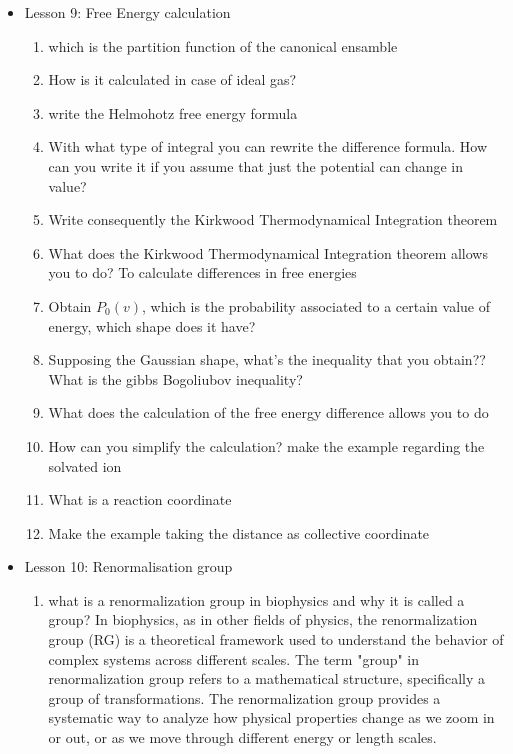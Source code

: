 {\begin{itemize}
\begin{enumerate}
    \end{enumerate}
    \item Lesson 9: Free Energy calculation
    \begin{enumerate}
        \item which is the partition function of the canonical ensamble
        \item How is it calculated in case of ideal gas?
        \item write the Helmohotz free energy formula
        \item With what type of integral you can rewrite the difference formula. How can you write it if you assume that just the potential can change in value?
        \item Write consequently the Kirkwood Thermodynamical Integration theorem
        \item What does the Kirkwood Thermodynamical Integration theorem allows you to do? To calculate differences in free energies
        \item Obtain $P_0(v)$, which is the probability associated to a certain value of energy, which shape does it have?
        \item Supposing the Gaussian shape, what's the inequality that you obtain?? What is the gibbs Bogoliubov inequality?
        \item What does the calculation of the free energy difference allows you to do
        \item How can you simplify the calculation? make the example regarding the solvated ion
        \item What is a reaction coordinate
        \item Make the example taking the distance as collective coordinate
    \end{enumerate}
    \item Lesson 10: Renormalisation group
    \begin{enumerate}
        \item what is a renormalization group in biophysics and why it is called a group? 
        In biophysics, as in other fields of physics, the renormalization group (RG) is a theoretical framework used to understand the behavior of 
        complex systems across different scales. The term "group" in renormalization group refers to a mathematical structure, specifically a group of 
        transformations. The renormalization group provides a systematic way to analyze how physical properties change as we zoom in or out, or as we
         move through different energy or length scales.

\end{enumerate}
\end{itemize}}
